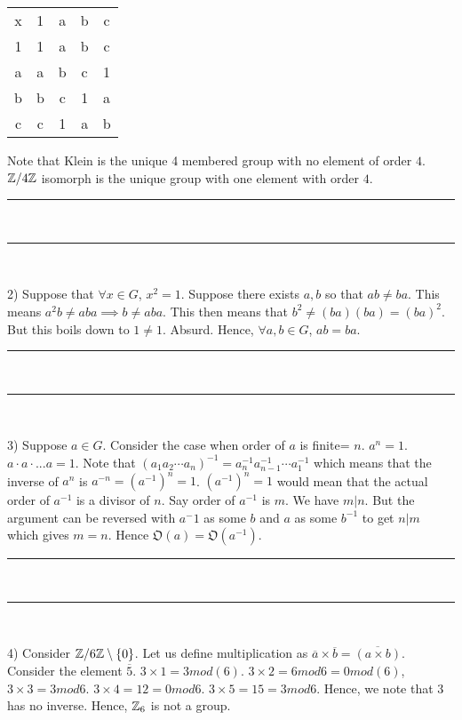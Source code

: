 \documentclass[../Main.tex]{subfiles}
\begin{document}
\begin{center}

    \begin{tabular}{ c c c c c }
    x & 1 & a & b & c \\
    1 & 1 & a & b & c \\
    a & a & b & c & 1 \\
    b & b & c & 1 & a \\
    c & c & 1 & a & b \\
    \end{tabular}
\end{center} 
Note that Klein is the unique 4 membered group with no element of order $4$. $\mathbb Z/4\mathbb Z$ isomorph is the unique group with one element with order $4$. 
\begin{center}    
    \rule[1ex]{.8\textwidth}{1pt}\\
    \rule[1.9ex]{.7\textwidth}{.6pt}\\[-6pt]
    
\end{center}
2) Suppose that $\forall x \in G$, $x^2=1$. Suppose there exists $a,b$ so that $ab \neq ba$. This means $a^2b \neq aba \implies b \neq aba$. This then means that $b^2 \neq (ba)(ba)=(ba)^2$. But this boils down to $1 \neq 1$. Absurd. Hence, $\forall a,b \in G$, $ab=ba$.
\begin{center}    
    \rule[1ex]{.8\textwidth}{1pt}\\
    \rule[1.9ex]{.7\textwidth}{.6pt}\\[-6pt]
    
\end{center}
3) Suppose $a \in G$. Consider the case when order of $a$ is finite= $n$. $a^n=1$. $a \cdot a \cdot ... a =1$. Note that $(a_1 a_2 \cdots a_n)^{-1}=a_n^{-1}a_{n-1}^{-1} \cdots a_1^{-1}$ which means that the inverse of $a^n$ is $a^{-n}=(a^{-1})^n=1$. $(a^{-1})^n=1$ would mean that the actual order of $a^{-1}$ is a divisor of $n$. Say order of $a^{-1}$ is $m$. We have $m|n$. But the argument can be reversed with $a^-1$ as some $b$ and $a $ as some $b^{-1}$ to get $n|m$ which gives $m=n$. Hence $\mathfrak{O}(a)=\mathfrak{O}(a^{-1})$.
\begin{center}    
    \rule[1ex]{.8\textwidth}{1pt}\\
    \rule[1.9ex]{.7\textwidth}{.6pt}\\[-6pt]
    
\end{center}
4) Consider $\mathbb Z / 6 \mathbb Z \setminus\{0\}$. Let us define multiplication as $\overline{a} \times \overline{b}= \overline{(a \times b)}$. Consider the element $\overline{5}$. $3 \times 1=3 mod(6)$. $3 \times 2=6 mod 6=0mod(6)$, $3 \times 3=3 mod 6$. $3 \times 4=12=0 mod 6$. $3 \times 5=15=3 mod 6$. Hence, we note that $3$ has no inverse. Hence, $\mathbb Z_6$ is not a group. 
\end{document}
